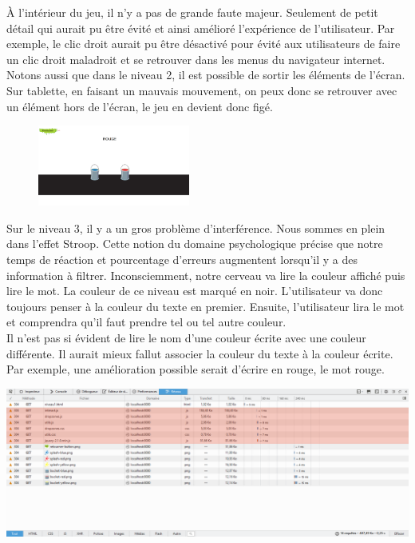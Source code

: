 \documentclass{article}
\begin{document}
\`A l'int\'erieur du jeu, il n'y a pas de grande faute majeur. Seulement de petit d\'etail qui aurait pu \^etre \'evit\'e et ainsi am\'elior\'e l'exp\'erience de l'utilisateur. Par exemple, le clic droit aurait pu \^etre d\'esactiv\'e pour \'evit\'e aux utilisateurs de faire un clic droit maladroit et se retrouver dans les menus du navigateur internet. Notons aussi que dans le niveau 2, il est possible de sortir les \'el\'ements de l'\'ecran. Sur tablette, en faisant un mauvais mouvement, on peux donc se retrouver avec un \'el\'ement hors de l'\'ecran, le jeu en devient donc fig\'e.\\
\begin{figure}
\vspace{6pt}
\centering
\includegraphics[width=5cm]{6}
\end{figure}
{\hspace*{0.6cm}Sur le niveau 3, il y a un gros probl\`eme d'interf\'erence. Nous sommes en plein dans l'effet Stroop. Cette notion du domaine psychologique pr\'ecise que notre temps de r\'eaction et pourcentage d'erreurs augmentent lorsqu'il y a des information \`a filtrer. Inconsciemment, notre cerveau va lire la couleur affich\'e puis lire le mot. La couleur de ce niveau est marqu\'e en noir. L'utilisateur va donc toujours penser \`a la couleur du texte en premier. Ensuite, l'utilisateur lira le mot et comprendra qu'il faut prendre tel ou tel autre couleur.}
\vspace{0.5cm}\\
Il n'est pas si \'evident de lire le nom d'une couleur \'ecrite avec une couleur diff\'erente. Il aurait mieux fallut associer la couleur du texte \`a la couleur \'ecrite. Par exemple, une am\'elioration possible serait d'\'ecrire en rouge, le mot rouge.

\newpage

\begin{center}
\vspace{0.5cm}
\includegraphics[width=\textwidth]{7}\\
\end{center}
\end{document}
